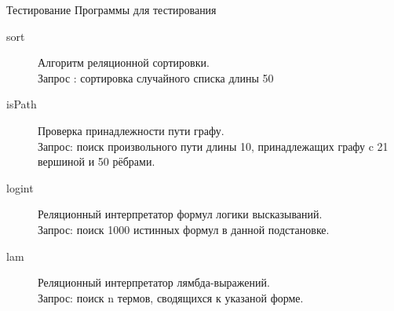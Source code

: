 \documentclass[xcolor=table]{beamer}
\begin{document}
%
\begin{frame}{Тестирование}
{\small Программы для тестирования}
\begin{description}
\item[sort]Алгоритм реляционной сортировки.\\
      Запрос : сортировка случайного списка длины 50
\item[isPath] Проверка принадлежности пути графу.\\
      Запрос: поиск  произвольного пути длины 10, принадлежащих графу c 21 вершиной и 50 рёбрами.
\item[logint] Реляционный интерпретатор формул логики высказываний.\\
      Запрос: поиск 1000 истинных формул в данной подстановке.
\item[lam] Реляционный интерпретатор лямбда-выражений.\\
      Запрос: поиск n термов, сводящихся к указаной форме.
\end{description}
\end{frame}
%
\end{document}
